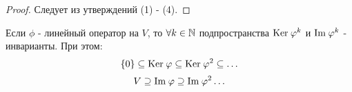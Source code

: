     \begin{proof}
        Следует из утверждений (1) - (4).
    \end{proof}
    \begin{subtheorem}
        Если $\phi$ - линейный оператор на $V$, то $\forall k \in \N$ подпространства $\text{Ker} \hspace{0.09cm} \phi^k$ и $\text{Im} \hspace{0.09cm} \phi^k$ - инварианты. При этом: 
        $$\{0\} \subseteq \text{Ker} \hspace{0.09cm} \phi \subseteq \text{Ker} \hspace{0.09cm} \phi^2 \subseteq \ldots$$
        $$V \supseteq \text{Im} \hspace{0.09cm} \phi \supseteq \text{Im} \hspace{0.09cm} \phi^2\ldots$$
    \end{subtheorem}

    
     

